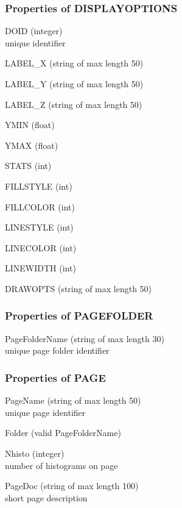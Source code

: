 \documentclass{lhcbnote}
\begin{document}
\subsubsection{Properties of DISPLAYOPTIONS}\label{dispopts}
\begin{description}
\item{DOID} (integer)\\
unique identifier 
\item{LABEL\_X}  (string of max length 50)
\item{LABEL\_Y}  (string of max length 50)
\item{LABEL\_Z}  (string of max length 50)
\item{YMIN} (float)
\item{YMAX} (float)
\item{STATS} (int)
\item{FILLSTYLE} (int)
\item{FILLCOLOR} (int)
\item{LINESTYLE} (int)
\item{LINECOLOR} (int)
\item{LINEWIDTH} (int)
\item{DRAWOPTS}  (string of max length 50)
\end{description}
\subsubsection{Properties of PAGEFOLDER}
\begin{description}
\item{PageFolderName} (string of max length 30)\\
unique page folder identifier
\end{description}

\subsubsection{Properties of PAGE}
\begin{description}
\item{PageName} (string of max length 50) \\
unique page identifier
\item{Folder} (valid PageFolderName) 
\item{Nhisto} (integer) \\
number of histograms on page
\item{PageDoc} (string of max length 100)\\
short page description
\end{description}
\end{document}
